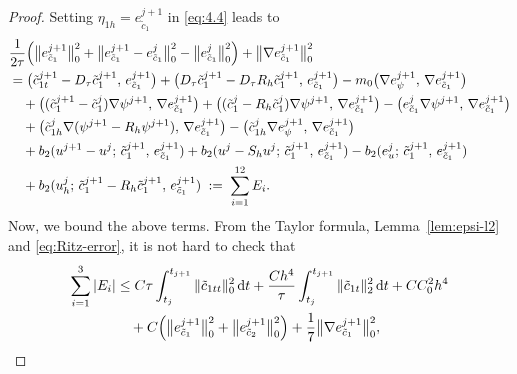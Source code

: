 \documentclass[a4paper,fleqn]{cas-sc}
\numberwithin{equation}{section}
\theoremstyle{definition}
\begin{document}
\begin{proof}
Setting $\eta_{1h} = e_{\tilde{c}_{1}}^{j+1}$ in \eqref{eq:4.4} leads to
\begin{align}
  &\frac{1}{2\tau}\Bigl(\bigl\|e_{\tilde{c}_{1}}^{j+1}\bigr\|_{0}^{2}
                       + \bigl\|e_{\tilde{c}_{1}}^{j+1} - e_{\tilde{c}_{1}}^{j}\bigr\|_{0}^{2}
                       - \bigl\|e_{\tilde{c}_{1}}^{j}\bigr\|_{0}^{2}\Bigr)
   + \bigl\|\nabla e_{\tilde{c}_{1}}^{j+1}\bigr\|_{0}^{2}
  \nonumber\\
  &= \bigl(\tilde{c}_{1t}^{j+1} - D_{\tau}\tilde{c}_{1}^{j+1},\, e_{\tilde{c}_{1}}^{j+1}\bigr)
   + \bigl(D_{\tau}\tilde{c}_{1}^{j+1} - D_{\tau}R_{h}\tilde{c}_{1}^{j+1},\, e_{\tilde{c}_{1}}^{j+1}\bigr)
   - m_{0}\bigl(\nabla e_{\psi}^{j+1},\, \nabla e_{\tilde{c}_{1}}^{j+1}\bigr)
  \nonumber\\
  &\quad + \bigl((\tilde{c}_{1}^{j+1}-\tilde{c}_{1}^{j})\nabla\psi^{j+1},\, \nabla e_{\tilde{c}_{1}}^{j+1}\bigr)
   + \bigl((\tilde{c}_{1}^{j} - R_{h}\tilde{c}_{1}^{j})\nabla\psi^{j+1},\, \nabla e_{\tilde{c}_{1}}^{j+1}\bigr)
   - \bigl(e_{\tilde{c}_{1}}^{j}\nabla\psi^{j+1},\, \nabla e_{\tilde{c}_{1}}^{j+1}\bigr)
  \nonumber\\
  &\quad + \bigl(\tilde{c}_{1h}^{j}\nabla(\psi^{j+1} - R_{h}\psi^{j+1}),\, \nabla e_{\tilde{c}_{1}}^{j+1}\bigr)
   - \bigl(\tilde{c}_{1h}^{j}\nabla e_{\psi}^{j+1},\, \nabla e_{\tilde{c}_{1}}^{j+1}\bigr)
  \nonumber\\
  &\quad + b_{2}(u^{j+1}-u^{j};\, \tilde{c}_{1}^{j+1},\, e_{\tilde{c}_{1}}^{j+1})
   + b_{2}(u^{j} - S_{h}u^{j};\, \tilde{c}_{1}^{j+1},\, e_{\tilde{c}_{1}}^{j+1})
   - b_{2}(e_{u}^{j};\, \tilde{c}_{1}^{j+1},\, e_{\tilde{c}_{1}}^{j+1})
  \nonumber\\
  &\quad + b_{2}(u_{h}^{j};\, \tilde{c}_{1}^{j+1} - R_{h}\tilde{c}_{1}^{j+1},\, e_{\tilde{c}_{1}}^{j+1})
   \;:=\; \sum_{i=1}^{12} E_{i}.
  \label{eq:4.11}
\end{align}
Now, we bound the above terms. From the Taylor formula, Lemma~\ref{lem:epsi-l2} and \eqref{eq:Ritz-error}, it is not hard to check that
\begin{align}
  \sum_{i=1}^{3}|E_{i}|
  &\leq C\tau\int_{t_{j}}^{t_{j+1}}\|\tilde{c}_{1tt}\|_{0}^{2}\,\mathrm{d}t
   + \frac{Ch^{4}}{\tau}\int_{t_{j}}^{t_{j+1}}\|\tilde{c}_{1t}\|_{2}^{2}\,\mathrm{d}t
   + CC_{0}^{2}h^{4} \nonumber\\
  &\quad + C\Bigl(\bigl\|e_{\tilde{c}_{1}}^{j+1}\bigr\|_{0}^{2}
                 + \bigl\|e_{\tilde{c}_{2}}^{j+1}\bigr\|_{0}^{2}\Bigr)
   + \frac{1}{7}\bigl\|\nabla e_{\tilde{c}_{1}}^{j+1}\bigr\|_{0}^{2},

\end{align}
\end{proof}
\end{document}
